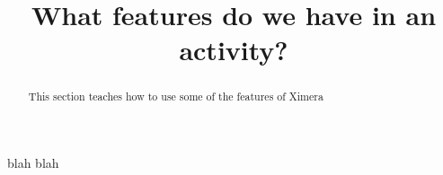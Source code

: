 \documentclass{ximera}
\begin{document}
	\title{What features do we have in an activity?}
	\begin{abstract}
		This section teaches how to use some of the features of Ximera
	\end{abstract}
	
	blah blah
\end{document}
